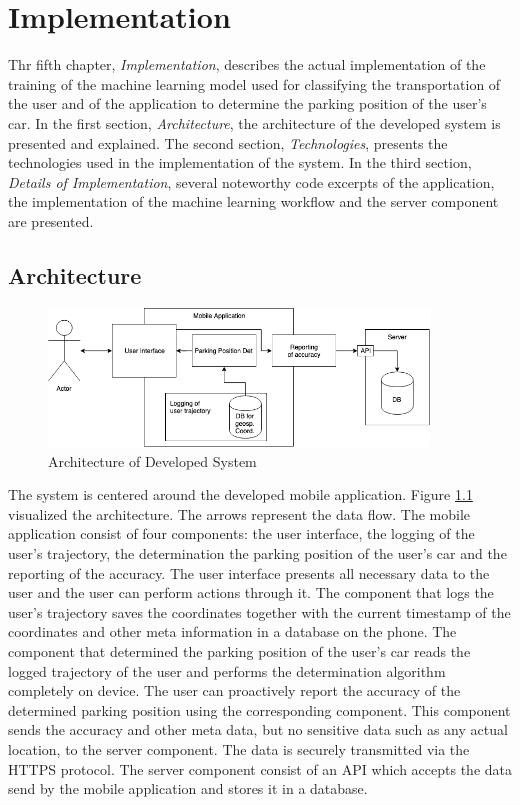 \chapter{Implementation}
Thr fifth chapter, \textit{Implementation}, describes the actual implementation of the training of the machine learning model used for classifying the transportation of the user and of the application to determine the parking position of the user's car. 
In the first section, \textit{Architecture}, the architecture of the developed system is presented and explained.
The second section, \textit{Technologies}, presents the technologies used in the implementation of the system.
In the third section, \textit{Details of Implementation}, several noteworthy code excerpts of the application, the implementation of the machine learning workflow and the server component are presented.

\section{Architecture}

\begin{figure}[h]
    \centering
    \includegraphics[width=0.9\textwidth]{images/architecture.png}
    \caption{Architecture of Developed System}
    \label{fig:architecture}
\end{figure}


The system is centered around the developed mobile application. Figure \ref{fig:architecture} visualized the architecture. The arrows represent the data flow.  The mobile application consist of four components: the user interface, the logging of  the user's trajectory, the determination the parking position of the user's car and the reporting of the accuracy. The user interface presents all necessary data to the user and the user can perform actions through it. The component that logs the user's trajectory saves the coordinates together with the current timestamp of the coordinates and other meta information in a database on the phone. The component that determined the parking position of the user's car reads the logged trajectory of the user and performs the determination algorithm completely on device. The user can proactively report the accuracy of the determined parking position using the corresponding component. This component sends the accuracy and other meta data, but no sensitive data such as any actual location, to the server component. The data is securely transmitted via the HTTPS protocol. The server component consist of an API which accepts the data send by the mobile application and stores it in a database.

